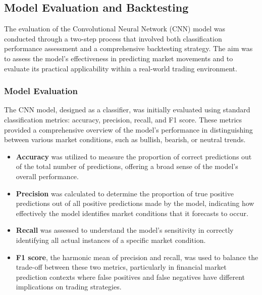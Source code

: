 \thesisspacing %

\subsection{Model Evaluation and Backtesting}

The evaluation of the Convolutional Neural Network (CNN) model was conducted through a two-step process that involved both classification performance assessment and a comprehensive backtesting strategy. The aim was to assess the model's effectiveness in predicting market movements and to evaluate its practical applicability within a real-world trading environment.

\subsubsection{Model Evaluation}

The CNN model, designed as a classifier, was initially evaluated using standard classification metrics: accuracy, precision, recall, and F1 score. These metrics provided a comprehensive overview of the model's performance in distinguishing between various market conditions, such as bullish, bearish, or neutral trends.

\begin{itemize}
    \item \textbf{Accuracy} was utilized to measure the proportion of correct predictions out of the total number of predictions, offering a broad sense of the model's overall performance.
    \item \textbf{Precision} was calculated to determine the proportion of true positive predictions out of all positive predictions made by the model, indicating how effectively the model identifies market conditions that it forecasts to occur.
    \item \textbf{Recall} was assessed to understand the model's sensitivity in correctly identifying all actual instances of a specific market condition.
    \item \textbf{F1 score}, the harmonic mean of precision and recall, was used to balance the trade-off between these two metrics, particularly in financial market prediction contexts where false positives and false negatives have different implications on trading strategies.
\end{itemize}

